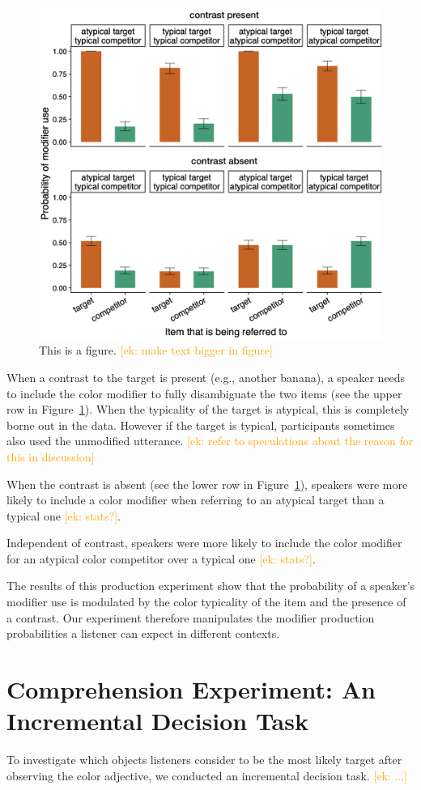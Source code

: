 \documentclass[10pt,letterpaper]{article}
\newcommand{\ek}[1]{\textcolor{Orange}{[ek: #1]}}
\begin{document}
\begin{figure}
	\begin{center}
		\includegraphics[width=.45\textwidth]{graphs/prod-bycond-paper.pdf}
	\end{center}
\caption{This is a figure. \ek{make text bigger in figure}} 
\label{prod-results}
\end{figure}

When a contrast to the target is present (e.g., another banana), a speaker needs to include the color modifier to fully disambiguate the two items (see the upper row in Figure~\ref{prod-results}). When the typicality of the target is atypical, this is completely borne out in the data. However if the target is typical, participants sometimes also used the unmodified utterance. \ek{refer to speculations about the reason for this in discussion} 

When the contrast is absent (see the lower row in Figure~\ref{prod-results}), speakers were more likely to include a color modifier when referring to an atypical target than a typical one \ek{stats?}.

Independent of contrast, speakers were more likely to include the color modifier for an atypical color competitor over a typical one \ek{stats?}.

The results of this production experiment show that the probability of a speaker's modifier use is modulated by the color typicality of the item and the presence of a contrast. Our experiment therefore manipulates the modifier production probabilities a listener can expect in different contexts.


\section{Comprehension Experiment: An Incremental Decision Task}
To investigate which objects listeners consider to be the most likely target after observing the color adjective, we conducted an incremental decision task. \ek{...}
\end{document}
